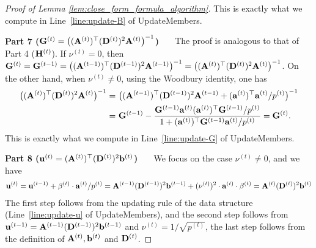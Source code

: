 \begin{proof}[Proof of Lemma \ref{lem:close_form_formula_algorithm}]
This is exactly what we compute in Line~\ref{line:update-B} of {\sc UpdateMembers}.




{ \bf Part 7 ($\mathbf{G}^{(t)} = \big( (\mathbf{A}^{(t)})^{\top} (\mathbf{D}^{(t)})^2 \mathbf{A}^{(t)} \big)^{-1}$) \ \ } 
The proof is analogous to that of Part 4 ($\mathbf{H}^{(t)}$). 
If $\nu^{(t)} = 0$, then $\mathbf{G}^{(t)} = \mathbf{G}^{(t-1)} = \big( (\mathbf{A}^{(t-1)})^{\top} (\mathbf{D}^{(t-1)})^2 \mathbf{A}^{(t-1)} \big)^{-1} = \big( (\mathbf{A}^{(t)})^{\top} (\mathbf{D}^{(t)})^2 \mathbf{A}^{(t)} \big)^{-1}$.
On the other hand, when $\nu^{(t)} \neq 0$, using the Woodbury identity, one has
\begin{align*}
    \big( (\mathbf{A}^{(t)})^{\top} (\mathbf{D}^{(t)})^2 \mathbf{A}^{(t)} \big)^{-1}  = &~ \big( (\mathbf{A}^{(t-1)})^{\top} (\mathbf{D}^{(t-1)})^2 \mathbf{A}^{(t-1)} + (\mathbf{a}^{(t)})^{\top}\mathbf{a}^{(t)}/p^{(t)} \big)^{-1}  \\
    =&~ \mathbf{G}^{(t-1)} - \frac{\mathbf{G}^{(t-1)}\mathbf{a}^{(t)} (\mathbf{a}^{(t)})^{\top} \mathbf{G}^{(t-1)} / p^{(t)}}{1 + (\mathbf{a}^{(t)})^{\top} \mathbf{G}^{(t-1)} \mathbf{a}^{(t)} / p^{(t)}}
    = \mathbf{G}^{(t)}.
\end{align*}
This is exactly what we compute in Line~\ref{line:update-G} of {\sc UpdateMembers}.


{ \bf Part 8 ($\mathbf{u}^{(t)} = (\mathbf{A}^{(t)})^{\top}(\mathbf{D}^{(t)})^2 \mathbf{b}^{(t)}$) \ \ } 
We focus on the case $\nu^{(t)} \neq 0$, and we have
\begin{align*}
    \mathbf{u}^{(t)} = \mathbf{u}^{(t-1)} + \beta^{(t)} \cdot \mathbf{a}^{(t)} / p^{(t)} = \mathbf{A}^{(t-1)}(\mathbf{D}^{(t-1)})^2 \mathbf{b}^{(t-1)} + (\nu^{(t)})^2 \cdot \mathbf{a}^{(t)} \cdot \beta^{(t)} = \mathbf{A}^{(t)}(\mathbf{D}^{(t)})^2 \mathbf{b}^{(t)}
\end{align*}
The first step follows from the updating rule of the data structure (Line~\ref{line:update-u} of {\sc UpdateMembers}), and the second step follows from $\mathbf{u}^{(t-1)}= \mathbf{A}^{(t-1)}(\mathbf{D}^{(t-1)})^2 \mathbf{b}^{(t-1)}$ and $\nu^{(t)} = 1/\sqrt{p^{(t)}}$, the last step follows from the definition of $\mathbf{A}^{(t)}, \mathbf{b}^{(t)}$ and $\mathbf{D}^{(t)}$.
\end{proof}







